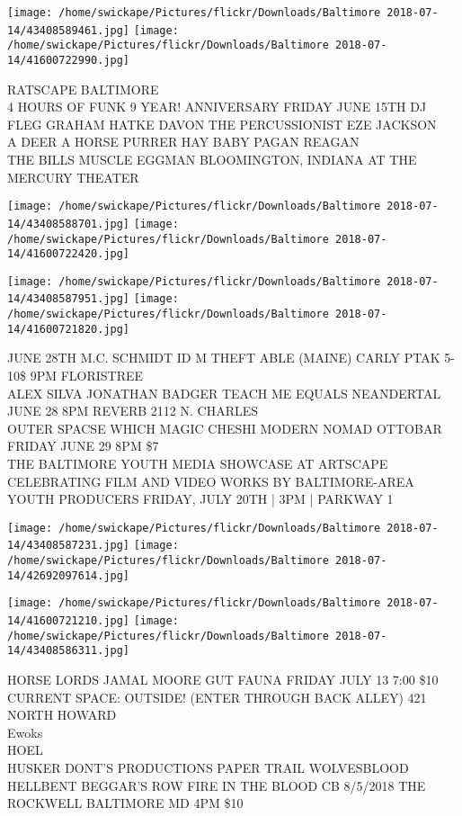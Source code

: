 \documentclass[10pt,letterpaper]{article}
\begin{document}
\texttt{[image: /home/swickape/Pictures/flickr/Downloads/Baltimore 2018-07-14/43408589461.jpg]}
\texttt{[image: /home/swickape/Pictures/flickr/Downloads/Baltimore 2018-07-14/41600722990.jpg]}

RATSCAPE BALTIMORE\\
4 HOURS OF FUNK 9 YEAR! ANNIVERSARY FRIDAY JUNE 15TH DJ FLEG GRAHAM HATKE DAVON THE PERCUSSIONIST EZE JACKSON\\
A DEER A HORSE PURRER HAY BABY PAGAN REAGAN\\
THE BILLS MUSCLE EGGMAN BLOOMINGTON, INDIANA AT THE MERCURY THEATER
\pagebreak

\texttt{[image: /home/swickape/Pictures/flickr/Downloads/Baltimore 2018-07-14/43408588701.jpg]}
\texttt{[image: /home/swickape/Pictures/flickr/Downloads/Baltimore 2018-07-14/41600722420.jpg]}

\texttt{[image: /home/swickape/Pictures/flickr/Downloads/Baltimore 2018-07-14/43408587951.jpg]}
\texttt{[image: /home/swickape/Pictures/flickr/Downloads/Baltimore 2018-07-14/41600721820.jpg]}

JUNE 28TH M.C. SCHMIDT ID M THEFT ABLE (MAINE) CARLY PTAK 5{-}10\$ 9PM FLORISTREE\\
ALEX SILVA JONATHAN BADGER TEACH ME EQUALS NEANDERTAL JUNE 28 8PM REVERB 2112 N. CHARLES\\
OUTER SPACSE WHICH MAGIC CHESHI MODERN NOMAD OTTOBAR FRIDAY JUNE 29 8PM \$7\\
THE BALTIMORE YOUTH MEDIA SHOWCASE AT ARTSCAPE CELEBRATING FILM AND VIDEO WORKS BY BALTIMORE{-}AREA YOUTH PRODUCERS FRIDAY, JULY 20TH | 3PM | PARKWAY 1
\pagebreak

\texttt{[image: /home/swickape/Pictures/flickr/Downloads/Baltimore 2018-07-14/43408587231.jpg]}
\texttt{[image: /home/swickape/Pictures/flickr/Downloads/Baltimore 2018-07-14/42692097614.jpg]}

\texttt{[image: /home/swickape/Pictures/flickr/Downloads/Baltimore 2018-07-14/41600721210.jpg]}
\texttt{[image: /home/swickape/Pictures/flickr/Downloads/Baltimore 2018-07-14/43408586311.jpg]}

HORSE LORDS JAMAL MOORE GUT FAUNA FRIDAY JULY 13 7:00 \$10 CURRENT SPACE: OUTSIDE!  (ENTER THROUGH BACK ALLEY) 421 NORTH HOWARD\\
Ewoks\\
HOEL\\
HUSKER DONT'S PRODUCTIONS PAPER TRAIL WOLVESBLOOD HELLBENT BEGGAR'S ROW FIRE IN THE BLOOD CB 8/5/2018 THE ROCKWELL BALTIMORE MD 4PM \$10
\pagebreak
\end{document}
